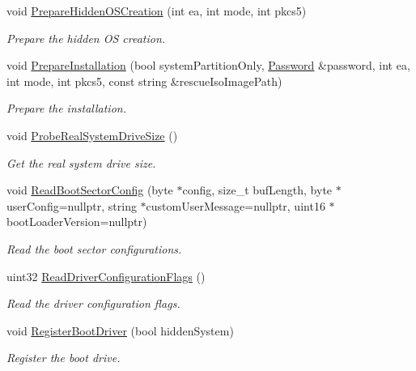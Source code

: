 \begin{DoxyCompactItemize}
void \hyperlink{class_gost_crypt_1_1_boot_encryption_a4b79045dfc8c9f05b29ebea5d02a4904}{Prepare\+Hidden\+O\+S\+Creation} (int ea, int mode, int pkcs5)
\begin{DoxyCompactList}\small\item\em Prepare the hidden OS creation. \end{DoxyCompactList}\item 
void \hyperlink{class_gost_crypt_1_1_boot_encryption_a0b1d3c4a491fffeed16d48a1f00e1429}{Prepare\+Installation} (bool system\+Partition\+Only, \hyperlink{struct_password}{Password} \&password, int ea, int mode, int pkcs5, const string \&rescue\+Iso\+Image\+Path)
\begin{DoxyCompactList}\small\item\em Prepare the installation. \end{DoxyCompactList}\item 
void \hyperlink{class_gost_crypt_1_1_boot_encryption_a45bbded21c341187133deeeda390f12d}{Probe\+Real\+System\+Drive\+Size} ()
\begin{DoxyCompactList}\small\item\em Get the real system drive size. \end{DoxyCompactList}\item 
void \hyperlink{class_gost_crypt_1_1_boot_encryption_a42fee6a10920d6e44487ee8a3ac2b17d}{Read\+Boot\+Sector\+Config} (byte $\ast$config, size\+\_\+t buf\+Length, byte $\ast$user\+Config=nullptr, string $\ast$custom\+User\+Message=nullptr, uint16 $\ast$boot\+Loader\+Version=nullptr)
\begin{DoxyCompactList}\small\item\em Read the boot sector configurations. \end{DoxyCompactList}\item 
uint32 \hyperlink{class_gost_crypt_1_1_boot_encryption_a948419f4d72d1da1943632761b47de08}{Read\+Driver\+Configuration\+Flags} ()
\begin{DoxyCompactList}\small\item\em Read the driver configuration flags. \end{DoxyCompactList}\item 
void \hyperlink{class_gost_crypt_1_1_boot_encryption_ab800499c17495d75aecfd93cd0942690}{Register\+Boot\+Driver} (bool hidden\+System)
\begin{DoxyCompactList}\small\item\em Register the boot drive. \end{DoxyCompactList}\item 

\end{DoxyCompactItemize}
